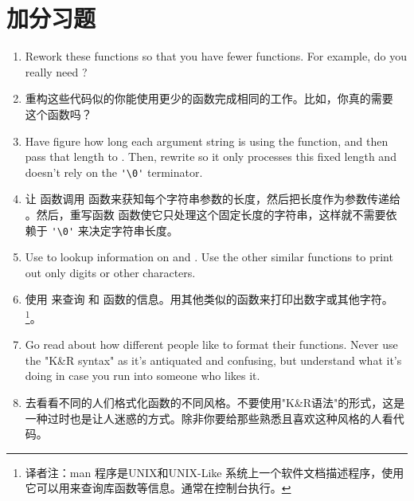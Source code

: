 \section{加分习题}

\begin{enumerate}
\item Rework these functions so that you have fewer functions.  For example,
    do you really need ?
\item 重构这些代码似的你能使用更少的函数完成相同的工作。比如，你真的需要  这个函数吗？
\item Have  figure how long each argument string
    is using the  function, and then pass that length
    to .  Then, rewrite  
    so it only processes this fixed length and doesn't rely on the
    \verb|'\0'| terminator.
\item 让  函数调用  函数来获知每个字符串参数的长度，然后把长度作为参数传递给 。然后，重写函数  函数使它只处理这个固定长度的字符串，这样就不需要依赖于 \verb|'\0'| 来决定字符串长度。
\item Use  to lookup information on 
    and .  Use the other similar functions to
    print out only digits or other characters.
\item 使用  来查询  和  函数的信息。用其他类似的函数来打印出数字或其他字符。\footnote{译者注：man 程序是UNIX和UNIX-Like 系统上一个软件文档描述程序，使用它可以用来查询库函数等信息。通常在控制台执行。}。
\item Go read about how different people like to format their
    functions.  Never use the "K\&R syntax" as it's antiquated and
    confusing, but understand what it's doing in case you run
    into someone who likes it.
\item 去看看不同的人们格式化函数的不同风格。不要使用"K\&R语法"的形式，这是一种过时也是让人迷惑的方式。除非你要给那些熟悉且喜欢这种风格的人看代码。
\end{enumerate}

